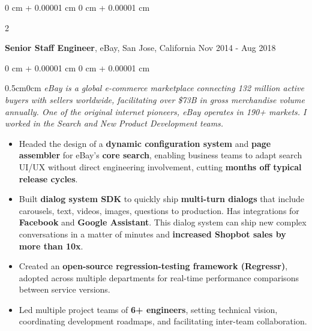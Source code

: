 \documentclass[10pt, letterpaper]{article}
\newenvironment{highlights}{
    \begin{itemize}[
        topsep=0.10 cm,
        parsep=0.10 cm,
        partopsep=0pt,
        itemsep=0pt,
        leftmargin=0 cm + 10pt
    ]
}{
    \end{itemize}
} %
\newenvironment{onecolentry}{
    \begin{adjustwidth}{
        0 cm + 0.00001 cm
    }{
        0 cm + 0.00001 cm
    }
}{
    \end{adjustwidth}
} %
\newenvironment{twocolentry}[2][]{
    \onecolentry
    \def\secondColumn{#2}
    \setcolumnwidth{\fill, 4.5 cm}
    \begin{paracol}{2}
}{
    \switchcolumn \raggedleft \secondColumn
    \end{paracol}
    \endonecolentry
} %
\begin{document}
        \vspace{0.15 cm}
        \begin{twocolentry}{
            Nov 2014 - Aug 2018
        }
            \textbf{Senior Staff Engineer}, eBay, San Jose, California\end{twocolentry}
        \vspace{0.10 cm}
        \begin{onecolentry}
            \begin{adjustwidth}{0.5cm}{0cm}
            \textit{eBay is a global e-commerce marketplace connecting 132 million active buyers with sellers worldwide, facilitating over \$73B in gross merchandise volume annually. One of the original internet pioneers, eBay operates in 190+ markets. I worked in the Search and New Product Development teams.}
            \end{adjustwidth}
            
            \vspace{0.10 cm}
            \begin{highlights}
                \item Headed the design of a \textbf{dynamic configuration system} and \textbf{page assembler} for eBay's \textbf{core search}, enabling business teams to adapt search UI/UX without direct engineering involvement, cutting \textbf{months off typical release cycles}.
                \item Built \textbf{dialog system SDK} to quickly ship \textbf{multi-turn dialogs} that include carousels, text, videos, images, questions to production. Has integrations for \textbf{Facebook} and \textbf{Google Assistant}. This dialog system can ship new complex conversations in a matter of minutes and \textbf{increased Shopbot sales by more than 10x}.
                \item Created an \textbf{open-source regression-testing framework (Regressr)}, adopted across multiple departments for real-time performance comparisons between service versions.
                \item Led multiple project teams of \textbf{6+ engineers}, setting technical vision, coordinating development roadmaps, and facilitating inter-team collaboration.
            \end{highlights}
        \end{onecolentry}
\end{document}
